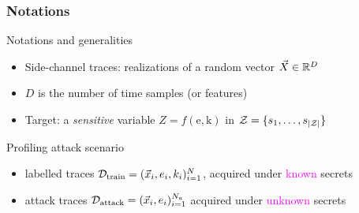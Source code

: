 \begin{frame}
\frametitle{Notations}
\begin{block}{Notations and generalities}
\begin{itemize}
\item Side-channel traces: realizations of a random vector $\vec{X} \in \mathbb{R}^D$  
\item $D$ is the number of time samples (or features)
\item Target: a \emph{sensitive} variable $Z = f(\mathrm{e,k})$ in $\mathcal{Z} = \{s_{1}, \dots, s_{|\mathcal{Z}|}\}$
\end{itemize}
\end{block}
\vspace{-5pt}
\begin{block}{Profiling attack scenario}
\begin{itemize}
\item labelled traces $\mathcal{D}_{\text{train}} = (\vec{x}_i, e_i, k_i)_{i=1}^N$, acquired under \textcolor{magenta}{known} secrets
\item attack traces $\mathcal{D}_{\text{attack}} = (\vec{x}_i, e_i)_{i=1}^{N_a}$ acquired under \textcolor{magenta}{unknown} secrets
\end{itemize}
\end{block}
\end{frame}




